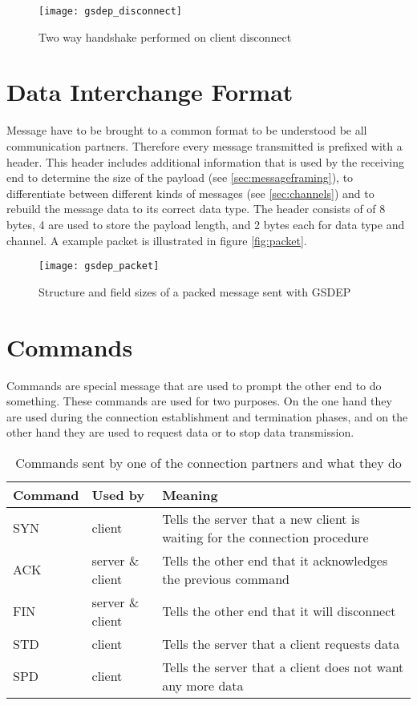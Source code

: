 \begin{figure}[h]
    \centering
    \texttt{[image: gsdep\_disconnect]}
    \caption{Two way handshake performed on client disconnect}
    \label{fig:disconnect}
\end{figure}

\section{Data Interchange Format}

Message have to be brought to a common format to be understood be all communication partners. Therefore every message transmitted is prefixed with a header. This header includes additional information that is used by the receiving end to determine the size of the payload (see \vref{sec:messageframing}), to differentiate between different kinds of messages (see \vref{sec:channels}) and to rebuild the message data to its correct data type. The header consists of of 8 bytes, 4 are used to store the payload length, and 2 bytes each for data type and channel. A example packet is illustrated in figure \vref{fig:packet}.

\begin{figure}[h]
    \centering
    \texttt{[image: gsdep\_packet]}
    \caption{Structure and field sizes of a packed message sent with GSDEP}
    \label{fig:packet}
\end{figure}

\section{Commands}
\label{sec:networking_command}

Commands are special message that are used to prompt the other end to do something. These commands are used for two purposes. On the one hand they are used during the connection establishment and termination phases, and on the other hand they are used to request data or to stop data transmission.

\begin{table}[h]
    \centering
    \begin{tabular}{| l | l | p{5cm} |}
    \hline
    \textbf{Command} & \textbf{Used by} & \textbf{Meaning} \\ \hline
    SYN & client & Tells the server that a new client is waiting for the connection procedure \\ \hline
    ACK & server \& client & Tells the other end that it acknowledges the previous command \\ \hline
    FIN & server \& client & Tells the other end that it will disconnect \\ \hline
    STD & client & Tells the server that a client requests data\\ \hline
    SPD & client & Tells the server that a client does not want any more data\\
    \hline
    \end{tabular}
    \caption{Commands sent by one of the connection partners and what they do}
    \label{tab:commands}
\end{table}

